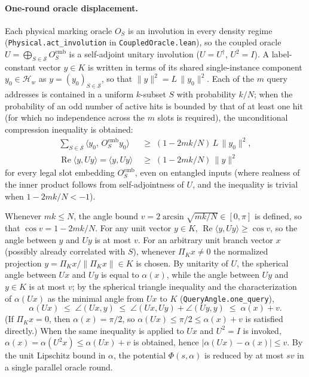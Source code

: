 \documentclass[11pt,a4paper]{article}
\theoremstyle{definition}
\theoremstyle{remark}
\begin{document}
\paragraph{One-round oracle displacement.}
Each physical marking oracle \(O_S\) is an involution in every density regime (\texttt{Physical.act\_involution} in \texttt{CoupledOracle.lean}), so the coupled oracle \(U = \bigoplus_{S \in \mathcal{S}} O_S^{\mathrm{emb}}\) is a self-adjoint unitary involution (\(U = U^\dagger\), \(U^2 = I\)). A label-constant vector \(y \in K\) is written in terms of its shared single-instance component \(y_0 \in \mathcal{H}_w\) as \(y = (y_0)_{S \in \mathcal{S}}\), so that \(\|y\|^2 = L\,\|y_0\|^2\). Each of the \(m\) query addresses is contained in a uniform \(k\)-subset \(S\) with probability \(k/N\); when the probability of an odd number of active hits is bounded by that of at least one hit (for which no independence across the \(m\) slots is required), the unconditional compression inequality is obtained:
\[
  \begin{aligned}
  \sum_{S \in \mathcal{S}} \langle y_0,\, O_S^{\mathrm{emb}} y_0 \rangle
  &\;\ge\; (1 - 2mk/N)\,L\,\|y_0\|^2, \\
  \operatorname{Re}\langle y, U y \rangle = \langle y, U y \rangle
  &\;\ge\; (1 - 2mk/N)\,\|y\|^2
  \end{aligned}
\]
for every legal slot embedding \(O_S^{\mathrm{emb}}\), even on entangled inputs (where realness of the inner product follows from self-adjointness of \(U\), and the inequality is trivial when \(1 - 2mk/N < -1\)).

Whenever \(mk \le N\), the angle bound \(v = 2\arcsin\sqrt{mk/N} \in [0, \pi]\) is defined, so that \(\cos v = 1 - 2mk/N\). For any unit vector \(y \in K\), \(\operatorname{Re}\langle y, U y\rangle \ge \cos v\), so the angle between \(y\) and \(U y\) is at most \(v\). For an arbitrary unit branch vector \(x\) (possibly already correlated with \(S\)), whenever \(\Pi_K x \ne 0\) the normalized projection \(y = \Pi_K x / \|\Pi_K x\| \in K\) is chosen. By unitarity of \(U\), the spherical angle between \(U x\) and \(U y\) is equal to \(\alpha(x)\), while the angle between \(U y\) and \(y \in K\) is at most \(v\); by the spherical triangle inequality and the characterization of \(\alpha(U x)\) as the minimal angle from \(U x\) to \(K\) (\texttt{QueryAngle.one\_query}),
\[
  \alpha(U x) \;\le\; \angle(U x, y) \;\le\; \angle(U x, U y) + \angle(U y, y) \;\le\; \alpha(x) + v.
\]
(If \(\Pi_K x = 0\), then \(\alpha(x) = \pi/2\), so \(\alpha(U x) \le \pi/2 \le \alpha(x) + v\) is satisfied directly.) When the same inequality is applied to \(U x\) and \(U^2 = I\) is invoked, \(\alpha(x) = \alpha(U^2 x) \le \alpha(U x) + v\) is obtained, hence \(|\alpha(U x) - \alpha(x)| \le v\). By the unit Lipschitz bound in \(\alpha\), the potential \(\Phi(s, \alpha)\) is reduced by at most \(s v\) in a single parallel oracle round.
\end{document}
